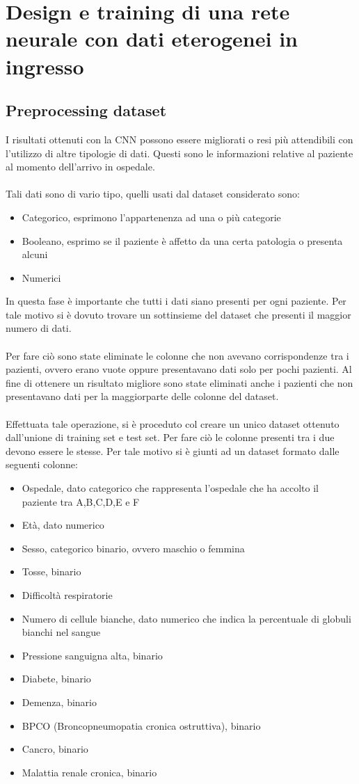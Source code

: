 \chapter{Design e training di una rete neurale con dati eterogenei in ingresso}
\label{ch:MLP}
\section{Preprocessing dataset}
I risultati ottenuti con la CNN possono essere migliorati o resi più attendibili con l'utilizzo
di altre tipologie di dati. Questi sono le informazioni relative al paziente al momento dell'arrivo in 
ospedale.
\\\\
Tali dati sono di vario tipo, quelli usati dal dataset considerato sono: 
\begin{itemize}
    \item Categorico, esprimono l'appartenenza ad una o più categorie
    \item Booleano, esprimo se il paziente è affetto da una certa patologia o presenta alcuni 
    \item Numerici
\end{itemize}
In questa fase è importante che tutti i dati siano presenti per ogni paziente. Per tale motivo si è dovuto 
trovare un sottinsieme del dataset che presenti il maggior numero di dati. 
\\\\
Per fare ciò sono state eliminate le colonne che non avevano corrispondenze 
tra i pazienti, ovvero erano vuote oppure presentavano dati solo per pochi pazienti.
Al fine di ottenere un risultato migliore sono state eliminati anche i pazienti che non presentavano dati per 
la maggiorparte delle colonne del dataset.
\\\\
Effettuata tale operazione, si è proceduto col creare un unico dataset ottenuto dall'unione 
di training set e test set. Per fare ciò le colonne presenti tra i due devono essere le stesse.
Per tale motivo si è giunti ad un dataset formato dalle seguenti colonne:
\begin{itemize}
    \item Ospedale, dato categorico che rappresenta l'ospedale che ha accolto il paziente tra A,B,C,D,E e F 
    \item Età, dato numerico
    \item Sesso, categorico binario, ovvero maschio o femmina
    \item Tosse, binario
    \item Difficoltà respiratorie
    \item Numero di cellule bianche, dato numerico che indica la percentuale di globuli bianchi nel sangue
    \item Pressione sanguigna alta,  binario
    \item Diabete, binario
    \item Demenza, binario 
    \item BPCO (Broncopneumopatia cronica ostruttiva), binario 
    \item Cancro, binario 
    \item Malattia renale cronica, binario
\end{itemize}
